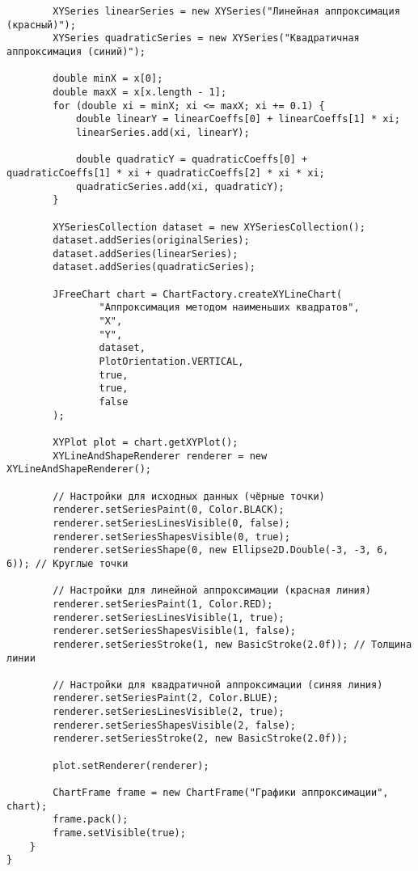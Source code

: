 \begin{verbatim}
        XYSeries linearSeries = new XYSeries("Линейная аппроксимация (красный)");
        XYSeries quadraticSeries = new XYSeries("Квадратичная аппроксимация (синий)");

        double minX = x[0];
        double maxX = x[x.length - 1];
        for (double xi = minX; xi <= maxX; xi += 0.1) {
            double linearY = linearCoeffs[0] + linearCoeffs[1] * xi;
            linearSeries.add(xi, linearY);

            double quadraticY = quadraticCoeffs[0] + quadraticCoeffs[1] * xi + quadraticCoeffs[2] * xi * xi;
            quadraticSeries.add(xi, quadraticY);
        }

        XYSeriesCollection dataset = new XYSeriesCollection();
        dataset.addSeries(originalSeries);
        dataset.addSeries(linearSeries);
        dataset.addSeries(quadraticSeries);

        JFreeChart chart = ChartFactory.createXYLineChart(
                "Аппроксимация методом наименьших квадратов",
                "X",
                "Y",
                dataset,
                PlotOrientation.VERTICAL,
                true,
                true,
                false
        );

        XYPlot plot = chart.getXYPlot();
        XYLineAndShapeRenderer renderer = new XYLineAndShapeRenderer();

        // Настройки для исходных данных (чёрные точки)
        renderer.setSeriesPaint(0, Color.BLACK);
        renderer.setSeriesLinesVisible(0, false);
        renderer.setSeriesShapesVisible(0, true);
        renderer.setSeriesShape(0, new Ellipse2D.Double(-3, -3, 6, 6)); // Круглые точки

        // Настройки для линейной аппроксимации (красная линия)
        renderer.setSeriesPaint(1, Color.RED);
        renderer.setSeriesLinesVisible(1, true);
        renderer.setSeriesShapesVisible(1, false);
        renderer.setSeriesStroke(1, new BasicStroke(2.0f)); // Толщина линии

        // Настройки для квадратичной аппроксимации (синяя линия)
        renderer.setSeriesPaint(2, Color.BLUE);
        renderer.setSeriesLinesVisible(2, true);
        renderer.setSeriesShapesVisible(2, false);
        renderer.setSeriesStroke(2, new BasicStroke(2.0f));

        plot.setRenderer(renderer);

        ChartFrame frame = new ChartFrame("Графики аппроксимации", chart);
        frame.pack();
        frame.setVisible(true);
    }
}
\end{verbatim}

